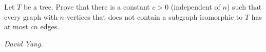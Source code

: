 Let $T$ be a tree. Prove that there is a constant $c>0$ (independent of $n$) such that every graph with $n$ vertices that does not contain a subgraph isomorphic to $T$ has at most $cn$ edges.

\textit{David Yang.}
